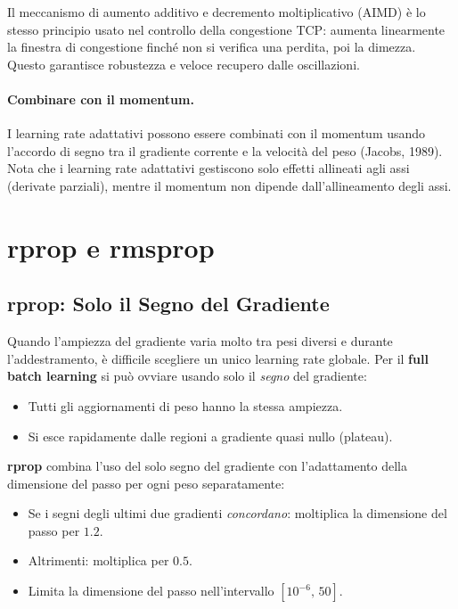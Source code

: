 \begin{tcolorbox}[colback=blue!5!white, colframe=blue!50!black, title=Analogia: AIMD nel controllo della congestione TCP]
Il meccanismo di aumento additivo e decremento moltiplicativo (AIMD) è lo stesso
principio usato nel controllo della congestione TCP: aumenta linearmente la
finestra di congestione finché non si verifica una perdita, poi la dimezza.
Questo garantisce robustezza e veloce recupero dalle oscillazioni.
\end{tcolorbox}

\paragraph{Combinare con il momentum.}
I learning rate adattativi possono essere combinati con il momentum usando
l'accordo di segno tra il gradiente corrente e la velocità del peso
(Jacobs, 1989). Nota che i learning rate adattativi gestiscono solo effetti
allineati agli assi (derivate parziali), mentre il momentum non dipende
dall'allineamento degli assi.

\section{rprop e rmsprop}
\label{sec:rprop-rmsprop}

\subsection{rprop: Solo il Segno del Gradiente}
\label{subsec:rprop}

Quando l'ampiezza del gradiente varia molto tra pesi diversi e durante
l'addestramento, è difficile scegliere un unico learning rate globale. Per il
\textbf{full batch learning} si può ovviare usando solo il \emph{segno} del
gradiente:

\begin{itemize}
  \item Tutti gli aggiornamenti di peso hanno la stessa ampiezza.
  \item Si esce rapidamente dalle regioni a gradiente quasi nullo (plateau).
\end{itemize}

\textbf{rprop} combina l'uso del solo segno del gradiente con l'adattamento
della dimensione del passo per ogni peso separatamente:

\begin{itemize}
  \item Se i segni degli ultimi due gradienti \emph{concordano}: moltiplica la
        dimensione del passo per $1.2$.
  \item Altrimenti: moltiplica per $0.5$.
  \item Limita la dimensione del passo nell'intervallo $[10^{-6},\, 50]$.
\end{itemize}

